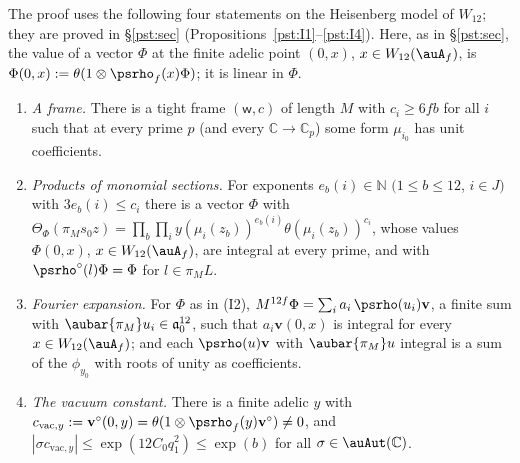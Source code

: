 \documentclass[10pt]{amsart}
\theoremstyle{definition}
\theoremstyle{remark}
\newcommand{\C}{\mathbb C}
\newcommand{\N}{\mathbb N}
\providecommand{\psvac}{\mathbf v}
\begin{document}
The proof uses the following four statements on the Heisenberg model of $W_{12}$; they are
proved in \S\ref{pst:sec} (Propositions~\ref{pst:I1}--\ref{pst:I4}). Here, as in \S\ref{pst:sec},
the value of a vector $\Phi$ at the finite adelic point $(0,x)$, $x\in W_{12}(\auA_f)$, is
$\Phi(0,x):=\theta(1\otimes\psrho_f(x)\Phi)$; it is linear in $\Phi$.
\begin{enumerate}
\item[(I1)] \emph{A frame.} There is a tight frame $(\mathsf w,c)$ of length $M$ with $c_i\ge6fb$
for all $i$ such that at every prime $p$ (and every $\C\to\C_p$) some form $\mu_{i_0}$ has unit
coefficients.
\item[(I2)] \emph{Products of monomial sections.} For exponents $e_b(i)\in\N$ $(1\le b\le12$,
$i\in J)$ with $3e_b(i)\le c_i$ there is a vector $\Phi$ with $\Theta_\Phi(\pi_Ms_0z)=\prod_{b}
\prod_iy(\mu_i(z_b))^{e_b(i)}\theta(\mu_i(z_b))^{c_i}$, whose values $\Phi(0,x)$,
$x\in W_{12}(\auA_f)$, are integral at every prime, and with $\psrho^\circ(l)\Phi=\Phi$ for $l\in\pi_ML$.
\item[(I3)] \emph{Fourier expansion.} For $\Phi$ as in (I2), $M^{12f}\Phi=\sum_ia_i\,\psrho(u_i)
\psvac$, a finite sum with $\aubar{\pi_M}u_i\in\mathfrak a_0^{12}$, such that $a_i\psvac(0,x)$
is integral for every $x\in W_{12}(\auA_f)$; and each $\psrho(u)\psvac$ with $\aubar{\pi_M}u$ integral
is a sum of the $\phi_{y_0}$ with roots of unity as coefficients.
\item[(I4)] \emph{The vacuum constant.} There is a finite adelic $y$ with $c_{\mathrm{vac},y}:=\psvac^\circ(0,
y)=\theta(1\otimes\psrho_f(y)\psvac^\circ)\ne0$, and $|\sigma c_{\mathrm{vac},y}|\le
\exp(12C_0q_1^2)\le\exp(b)$ for all $\sigma\in\auAut(\C)$.
\end{enumerate}
\end{document}
